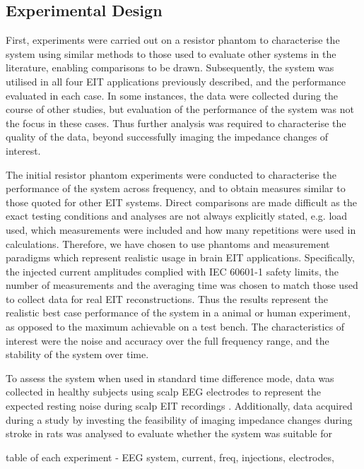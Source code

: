\subsection{Experimental Design}

First, experiments were carried out on a resistor phantom to characterise the system using similar methods to those used to evaluate other systems in the literature, enabling comparisons to be drawn. Subsequently, the system was utilised in all four EIT applications previously described, and the performance evaluated in each case. In some instances, the data were collected during the course of other studies, but evaluation of the performance of the system was not the focus in these cases. Thus further analysis was required to characterise the quality of the data, beyond successfully imaging the impedance changes of interest. 

The initial resistor phantom experiments were conducted to characterise the performance of the system across frequency, and to obtain measures similar to those quoted for other EIT systems. Direct comparisons are made difficult as the exact testing conditions and analyses are not always explicitly stated, e.g. load used, which measurements were included and how many repetitions were used in calculations. Therefore, we have chosen to use phantoms and measurement paradigms which represent realistic usage in brain EIT applications. Specifically, the injected current amplitudes complied with IEC 60601-1 \cite{IEC} safety limits, the number of measurements and the averaging time was chosen to match those used to collect data for real EIT reconstructions. Thus the results represent the realistic best case performance of the system  in a animal or human experiment, as opposed to the maximum achievable on a test bench. The characteristics of interest were the noise and accuracy over the full frequency range, and the stability of the system over time.

To assess the system when used in standard time difference mode, data was collected in healthy subjects using scalp EEG electrodes to represent the expected resting noise during scalp EIT recordings  \cite{Fabrizi_2006,fabrizi2007analysis,Romsauerova2006}. Additionally, data acquired during a study by \citet{Dowrick_2016} investing the feasibility of imaging impedance changes during stroke in rats was analysed to evaluate whether the system was suitable for 


table of each experiment - EEG system, current, freq, injections, electrodes, 

